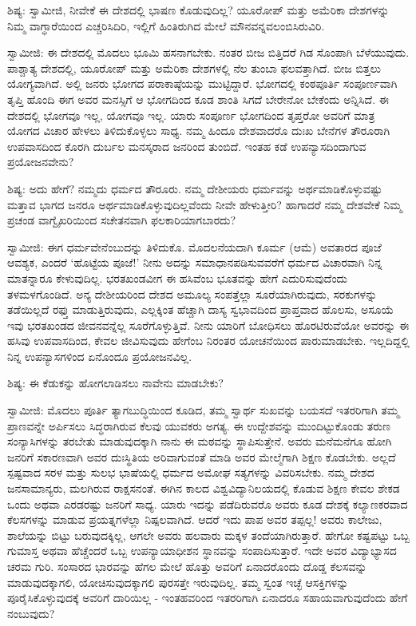ಶಿಷ್ಯ: ಸ್ವಾಮೀಜಿ, ನೀವೇಕೆ ಈ ದೇಶದಲ್ಲಿ ಭಾಷಣ ಕೊಡುವುದಿಲ್ಲ? ಯೂರೋಪ್ ಮತ್ತು ಅಮೆರಿಕಾ ದೇಶಗಳನ್ನು ನಿಮ್ಮ ವಾಗ್ಧಾರೆಯಿಂದ ಎಚ್ಚರಿಸಿದಿರಿ, ಇಲ್ಲಿಗೆ ಹಿಂತಿರುಗಿದ ಮೇಲೆ ಮೌನವನ್ನವಲಂಬಿಸಿರುವಿರಿ.

ಸ್ವಾಮೀಜಿ: ಈ ದೇಶದಲ್ಲಿ ಮೊದಲು ಭೂಮಿ ಹಸನಾಗಬೇಕು. ನಂತರ ಬೀಜ ಬಿತ್ತಿದರೆ ಗಿಡ ಸೊಂಪಾಗಿ ಬೆಳೆಯುವುದು. ಪಾಶ್ಚಾತ್ಯ ದೇಶದಲ್ಲಿ, ಯೂರೋಪ್ ಮತ್ತು ಅಮೆರಿಕಾ ದೇಶಗಳಲ್ಲಿ ನೆಲ ತುಂಬಾ ಫಲವತ್ತಾಗಿದೆ. ಬೀಜ ಬಿತ್ತಲು ಯೋಗ್ಯವಾಗಿದೆ. ಅಲ್ಲಿ ಜನರು ಭೋಗದ ಪರಾಕಾಷ್ಠೆಯನ್ನು ಮುಟ್ಟಿದ್ದಾರೆ. ಭೋಗದಲ್ಲಿ ಕಂಠಪೂರ್ತಿ ಸಂಪೂರ್ಣವಾಗಿ ತೃಪ್ತಿ ಹೊಂದಿ ಈಗ ಅವರ ಮನಸ್ಸಿಗೆ ಆ ಭೋಗದಿಂದ ಕೂಡ ಶಾಂತಿ ಸಿಗದೆ ಬೇರೇನೋ ಬೇಕೆಂದು ಅನ್ನಿಸಿದೆ. ಈ ದೇಶದಲ್ಲಿ ಭೋಗವೂ ಇಲ್ಲ, ಯೋಗವೂ ಇಲ್ಲ. ಯಾರು ಸಂಪೂರ್ಣ ಭೋಗದಿಂದ ತೃಪ್ತರೋ ಅವರಿಗೆ ಮಾತ್ರ ಯೋಗದ ವಿಚಾರ ಹೇಳಲು ತಿಳಿದುಕೊಳ್ಳಲು ಸಾಧ್ಯ. ನಮ್ಮ ಹಿಂದೂ ದೇಶವಾದರೊ ದುಃಖ ಬೇನೆಗಳ ತೌರೂರಾಗಿ ಉಪವಾಸದಿಂದ ಕೊರಗಿ ದುರ್ಬಲ ಮನಸ್ಕರಾದ ಜನರಿಂದ ತುಂಬಿದೆ. ಇಂತಹ ಕಡೆ ಉಪನ್ಯಾಸದಿಂದಾಗುವ ಪ್ರಯೋಜನವೇನು?

ಶಿಷ್ಯ: ಅದು ಹೇಗೆ? ನಮ್ಮದು ಧರ್ಮದ ತೌರೂರು. ನಮ್ಮ ದೇಶೀಯರು ಧರ್ಮವನ್ನು ಅರ್ಥಮಾಡಿಕೊಳ್ಳುವಷ್ಟು ಮತ್ತಾವ ಭಾಗದ ಜನರೂ ಅರ್ಥಮಾಡಿಕೊಳ್ಳುವುದಿಲ್ಲವೆಂದು ನೀವೇ ಹೇಳುತ್ತೀರಿ? ಹಾಗಾದರೆ ನಮ್ಮ ದೇಶವೇಕೆ ನಿಮ್ಮ ಪ್ರಚಂಡ ವಾಗ್ವೈಖರಿಯಿಂದ ಸಚೇತನವಾಗಿ ಫಲಕಾರಿಯಾಗಬಾರದು?

ಸ್ವಾಮೀಜಿ: ಈಗ ಧರ್ಮವೇನೆಂಬುದನ್ನು ತಿಳಿದುಕೊ. ಮೊದಲನೆಯದಾಗಿ ಕೂರ್ಮ (ಆಮೆ) ಅವತಾರದ ಪೂಜೆ ಆವಶ್ಯಕ, ಎಂದರೆ ‘ಹೊಟ್ಟೆಯ ಪೂಜೆ!’ ನೀನು ಅದನ್ನು ಸಮಾಧಾನಪಡಿಸುವವರೆಗೆ ಧರ್ಮದ ವಿಚಾರವಾಗಿ ನಿನ್ನ ಮಾತನ್ನಾರೂ ಕೇಳುವುದಿಲ್ಲ. ಭರತಖಂಡವೀಗ ಈ ಹಸಿವೆಂಬ ಭೂತವನ್ನು ಹೇಗೆ ಎದುರಿಸುವುದೆಂದು ತಳಮಳಗೊಂಡಿದೆ. ಅನ್ಯ ದೇಶೀಯರಿಂದ ದೇಶದ ಅಮೂಲ್ಯ ಸಂಪತ್ತೆಲ್ಲಾ ಸೂರೆಯಾಗಿರುವುದು, ಸರಕುಗಳನ್ನು ತಡೆಯಿಲ್ಲದೆ ರಫ್ತು ಮಾಡುತ್ತಿರುವುದು, ಎಲ್ಲಕ್ಕಿಂತ ಹೆಚ್ಚಾಗಿ ದಾಸ್ಯ ಸ್ವಭಾವದಿಂದ ಪ್ರಾಪ್ತವಾದ ಹೊಲಸು, ಅಸೂಯೆ ಇವು ಭರತಖಂಡದ ಜೀವನವನ್ನೆಲ್ಲ ಸೂರೆಗೊಳ್ಳುತ್ತಿವೆ. ನೀನು ಯಾರಿಗೆ ಬೋಧಿಸಲು ಹೊರಟಿರುವೆಯೋ ಅವರನ್ನು ಈ ಹಸಿವು ಉಪವಾಸದಿಂದ, ಕೇವಲ ಜೀವಿಸುವುದು ಹೇಗೆಂಬ ನಿರಂತರ ಯೋಚನೆಯಿಂದ ಪಾರುಮಾಡಬೇಕು. ಇಲ್ಲದಿದ್ದಲ್ಲಿ ನಿನ್ನ ಉಪನ್ಯಾಸಗಳಿಂದ ಏನೊಂದೂ ಪ್ರಯೋಜನವಿಲ್ಲ.

ಶಿಷ್ಯ: ಈ ಕೆಡುಕನ್ನು ಹೋಗಲಾಡಿಸಲು ನಾವೇನು ಮಾಡಬೇಕು?

ಸ್ವಾಮೀಜಿ: ಮೊದಲು ಪೂರ್ತಿ ತ್ಯಾಗಬುದ್ಧಿಯಿಂದ ಕೂಡಿದ, ತಮ್ಮ ಸ್ವಾರ್ಥ ಸುಖವನ್ನು ಬಯಸದೆ ಇತರರಿಗಾಗಿ ತಮ್ಮ ಪ್ರಾಣವನ್ನೇ ಅರ್ಪಿಸಲು ಸಿದ್ಧರಾಗಿರುವ ಕೆಲವು ಯುವಕರು ಅಗತ್ಯ. ಈ ಉದ್ದೇಶವನ್ನು ಮುಂದಿಟ್ಟುಕೊಂಡು ತರುಣ ಸಂನ್ಯಾಸಿಗಳನ್ನು ತರಬೇತು ಮಾಡುವುದಕ್ಕಾಗಿ ನಾನು ಈ ಮಠವನ್ನು ಸ್ಥಾಪಿಸುತ್ತೇನೆ. ಅವರು ಮನೆಮನೆಗೂ ಹೋಗಿ ಜನರಿಗೆ ಸಕಾರಣವಾಗಿ ಅವರ ದುಃಸ್ಥಿತಿಯ ಅರಿವಾಗುವಂತೆ ಮಾಡಿ ಅವರ ಮೇಲ್ಮೆಗಾಗಿ ಶಿಕ್ಷಣ ಕೊಡಬೇಕು. ಅಲ್ಲದೆ ಸ್ಪಷ್ಟವಾದ ಸರಳ ಮತ್ತು ಸುಲಭ ಭಾಷೆಯಲ್ಲಿ ಧರ್ಮದ ಅಮೋಘ ಸತ್ಯಗಳನ್ನು ವಿವರಿಸಬೇಕು. ನಮ್ಮ ದೇಶದ ಜನಸಾಮಾನ್ಯರು, ಮಲಗಿರುವ ರಾಕ್ಷಸನಂತೆ. ಈಗಿನ ಕಾಲದ ವಿಶ್ವವಿದ್ಯಾನಿಲಯದಲ್ಲಿ ಕೊಡುವ ಶಿಕ್ಷಣ ಕೇವಲ ಶೇಕಡ ಒಂದು ಅಥವಾ ಎರಡರಷ್ಟು ಜನರಿಗೆ ಸಾಧ್ಯ. ಯಾರು ಇದನ್ನು ಪಡೆದಿರುವರೊ ಅವರು ಕೂಡ ದೇಶಕ್ಕೆ ಕಲ್ಯಾಣಕರವಾದ ಕೆಲಸಗಳನ್ನು ಮಾಡುವ ಪ್ರಯತ್ನಗಳೆಲ್ಲಾ ನಿಷ್ಪಲವಾಗಿದೆ. ಆದರೆ ಇದು ಪಾಪ ಅವರ ತಪ್ಪಲ್ಲ! ಅವರು ಕಾಲೇಜು, ಶಾಲೆಯನ್ನು ಬಿಟ್ಟು ಬರುವುದಕ್ಕಿಲ್ಲ, ಆಗಲೇ ಅವರು ಹಲವಾರು ಮಕ್ಕಳ ತಂದೆಯಾಗಿರುತ್ತಾರೆ. ಹೇಗೋ ಕಷ್ಟಪಟ್ಟು ಒಬ್ಬ ಗುಮಾಸ್ತ ಅಥವಾ ಹೆಚ್ಚೆಂದರೆ ಒಬ್ಬ ಉಪನ್ಯಾಯಾಧೀಶನ ಸ್ಥಾನವನ್ನು ಸಂಪಾದಿಸುತ್ತಾರೆ. ಇದೇ ಅವರ ವಿದ್ಯಾಭ್ಯಾಸದ ಚರಮ ಗುರಿ. ಸಂಸಾರದ ಭಾರವನ್ನು ಹೆಗಲ ಮೇಲೆ ಹೊತ್ತು ಅವರಿಗೆ ಏನಾದರೊಂದು ದೊಡ್ಡ ಕೆಲಸವನ್ನು ಮಾಡುವುದಕ್ಕಾಗಲಿ, ಯೋಚಿಸುವುದಕ್ಕಾಗಲಿ ಪುರಸತ್ತೇ ಇರುವುದಿಲ್ಲ. ತಮ್ಮ ಸ್ವಂತ ಇಚ್ಛೆ ಆಸಕ್ತಿಗಳನ್ನು ಪೂರೈಸಿಕೊಳ್ಳುವುದಕ್ಕೆ ಅವರಿಗೆ ದಾರಿಯಿಲ್ಲ - ಇಂತಹವರಿಂದ ಇತರರಿಗಾಗಿ ಏನಾದರೂ ಸಹಾಯವಾಗುವುದೆಂದು ಹೇಗೆ ನಂಬುವುದು?

